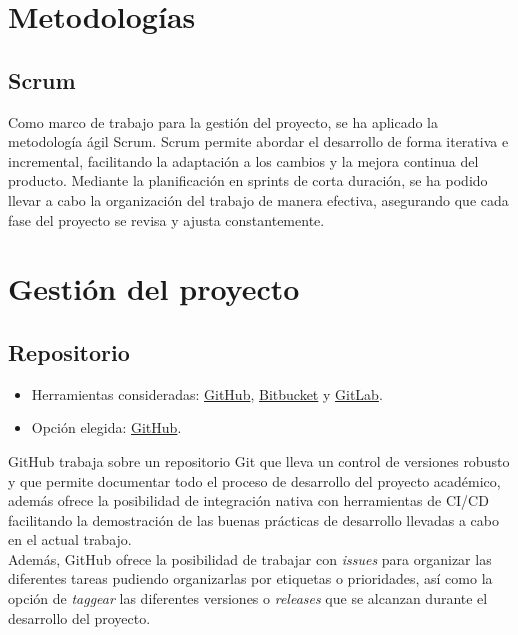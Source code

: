 
\section{Metodologías}\label{metodologias}

\subsection{Scrum}\label{scrum}
Como marco de trabajo para la gestión del proyecto, se ha aplicado la metodología ágil Scrum. Scrum permite abordar el desarrollo de forma iterativa e incremental, facilitando la adaptación a los cambios y la mejora continua del producto. Mediante la planificación en sprints de corta duración, se ha podido llevar a cabo la organización del trabajo de manera efectiva, asegurando que cada fase del proyecto se revisa y ajusta constantemente.\\

\section{Gestión del proyecto}\label{gestion-del-proyecto}

\subsection{Repositorio}\label{repositorio}

\begin{itemize}
\tightlist
\item
  Herramientas consideradas: \href{https://github.com/}{GitHub},
  \href{https://bitbucket.org/}{Bitbucket} y
  \href{https://gitlab.com/}{GitLab}.
\item
  Opción elegida: \href{https://github.com/}{GitHub}.
\end{itemize}

GitHub trabaja sobre un repositorio Git que lleva un control de versiones robusto y que permite documentar todo el proceso de desarrollo del proyecto académico, además ofrece la posibilidad de integración nativa con herramientas de CI/CD facilitando la demostración de las buenas prácticas de desarrollo llevadas a cabo en el actual trabajo.\\

Además, GitHub ofrece la posibilidad de trabajar con \emph{issues} para organizar las diferentes tareas pudiendo organizarlas por etiquetas o prioridades, así como la opción de \emph{taggear} las diferentes versiones o \emph{releases} que se alcanzan durante el desarrollo del proyecto.


